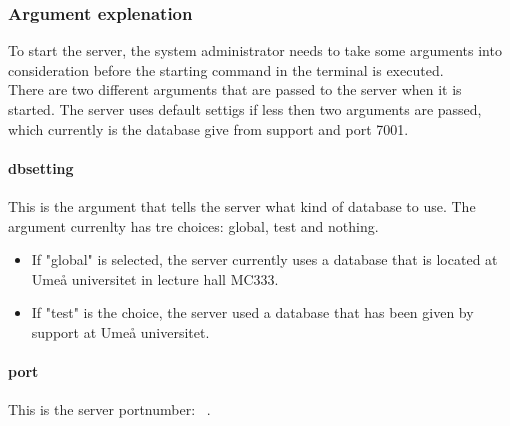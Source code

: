 \subsubsection{Argument explenation}
\label{sec:com_ArgExpl}
To start the server, the system administrator needs to take some arguments into consideration before the starting command in the terminal is executed.\\
There are two different arguments that are passed to the server when it is started.
The server uses default settigs if less then two arguments are passed, which currently is the database give from support and port 7001.

\paragraph{dbsetting}
This is the argument that tells the server what kind of database to use.
The argument currenlty has tre choices: global, test and nothing. 

\begin{itemize}
\item If "global" is selected, the server currently uses a database that is located at Umeå universitet in lecture hall MC333.
\item If "test" is the choice, the server used a database that has been given by support at Umeå universitet. 
\end{itemize}

\paragraph{port}
This is the server portnumber: \serverPort\ .
